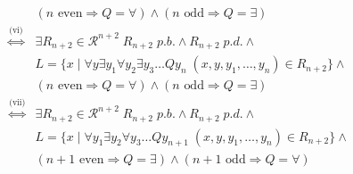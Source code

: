\documentclass [11pt]{article}
\newcommand{\sto}{\Rightarrow}
\begin{document}
\begin{equation*}
\begin{split}
&  (n \text{ even}  \sto Q=\forall )\land (n \text{ odd}  \sto Q=\exists )\\
\stackrel{\text{(vi)}}{\iff} & \exists R_{n+2}  \in  \mathcal{R}^{n+2} \; R_{n+2} \; p.b. \land R_{n+2} \; p.d. \land  \\
& L = \{x \mid \forall y \exists y_1 \forall y_2\exists y_3\dots Q y_n  \; (x,y,y_1,\ldots,y_n) \in R_{n+2}\}\land  \\ 
&  (n \text{ even}  \sto Q=\forall )\land (n \text{ odd}  \sto Q=\exists )\\
\stackrel{\text{(vii)}}{\iff} & \exists R_{n+2}  \in  \mathcal{R}^{n+2} \; R_{n+2} \; p.b. \land R_{n+2} \; p.d. \land  \\
& L = \{x \mid \forall y_1 \exists y_2 \forall y_3 \dots Q y_{n+1}  \; (x,y,y_1,\ldots,y_n) \in R_{n+2}\}  \land \\ 
&  (n+1 \text{ even}  \sto Q=\exists) \land (n+1 \text{ odd}  \sto Q=\forall) \\
\end{split}
\end{equation*}
\end{document}
